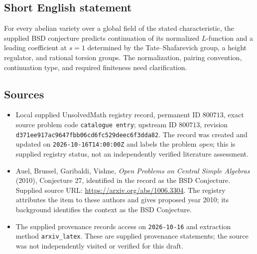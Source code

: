 \documentclass[11pt]{article}
\begin{document}
\subsection{Short English statement}
For every abelian variety over a global field of the stated characteristic, the supplied BSD conjecture predicts continuation of its normalized \(L\)-function and a leading coefficient at \(s=1\) determined by the Tate--Shafarevich group, a height regulator, and rational torsion groups. The normalization, pairing convention, continuation type, and required finiteness need clarification.
\subsection{Sources}
\begin{itemize}
\item Local supplied UnsolvedMath registry record, permanent ID \(800713\), exact source problem code \texttt{catalogue entry}; upstream ID \(800713\), revision \texttt{d371ee917ac9647fbb06cd6fc529deec6f3dda82}. The record was created and updated on \texttt{2026-10-16T14:00:00Z} and labels the problem \emph{open}; this is supplied registry status, not an independently verified literature assessment.
\item Auel, Brussel, Garibaldi, Vishne, \emph{Open Problems on Central Simple Algebras} (2010), Conjecture 27, identified in the record as the BSD Conjecture. Supplied source URL: \url{https://arxiv.org/abs/1006.3304}. The registry attributes the item to these authors and gives proposed year 2010; its background identifies the context as the BSD Conjecture.
\item The supplied provenance records access on \texttt{2026-10-16} and extraction method \texttt{arxiv\_latex}. These are supplied provenance statements; the source was not independently visited or verified for this draft.
\end{itemize}
\end{document}
